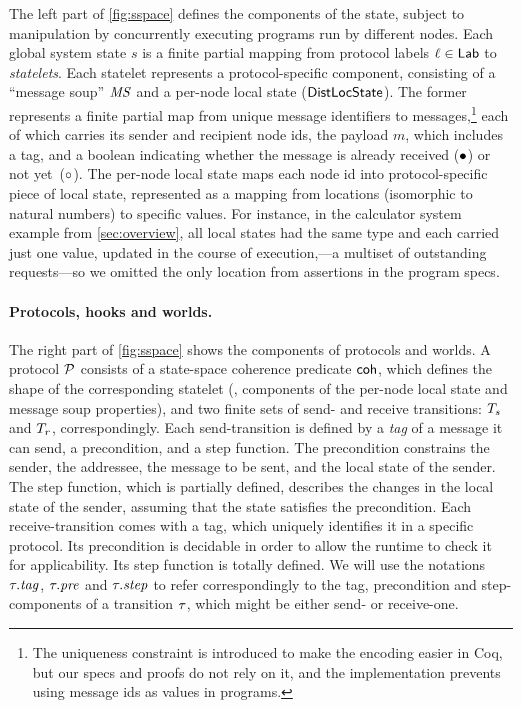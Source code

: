 The left part of \cref{fig:sspace} defines the components of the
state, subject to manipulation by concurrently executing programs run
by different nodes. Each global system state $s$ is a finite partial
mapping from protocol labels $\ell \in \mathsf{Lab}$ to \emph{statelets}. Each
statelet represents a protocol-specific component, consisting of a
``message soup'' $\mathit{MS}$ and a per-node local state ($\mathsf{DistLocState}$). The
former represents a finite partial map from unique message identifiers
to messages,\footnote{The uniqueness constraint is introduced to make
  the encoding easier in Coq, but our specs and proofs do not rely on
  it, and the implementation prevents using message ids as values in
  programs.} each of which carries its sender and recipient node ids,
the payload $m$, which includes a tag, and a boolean indicating
whether the message is already received ($\bullet$) or not
yet~($\circ$).
%
The per-node local state maps each node id into protocol-specific
piece of local state, represented as a mapping from locations
(isomorphic to natural numbers) to specific values. For instance, in
the calculator system example from \cref{sec:overview}, all
local states had the same type and each carried just one value,
updated in the course of execution,---a multiset of outstanding
requests---so we omitted the only location from assertions in the
program specs.


\paragraph{Protocols, hooks and worlds.}
\label{sec:protocols-worlds}

The right part of \cref{fig:sspace} shows the components of \disel
protocols and worlds. A protocol $\mathcal{P}$ consists of a state-space
coherence predicate $\mathsf{coh}$, which defines the shape of the
corresponding statelet (\ie, components of the per-node local state
and message soup properties), and two finite sets of send- and receive
transitions: $T_s$ and $T_r$, correspondingly.
%
Each send-transition is defined by a \emph{tag} of a message it can
send, a precondition, and a step function. The precondition constrains
the sender, the addressee, the message to be sent, and the local state
of the sender.
%
The step function, which is partially defined, describes the changes
in the local state of the sender, assuming that the state satisfies
the precondition.
%
Each receive-transition comes with a tag, which uniquely identifies it
in a specific protocol. Its precondition is decidable in order to
allow the runtime to check it for applicability. Its
step function is totally defined.
%
We will use the notations $\tau.\mathit{tag}$, $\tau.\mathit{pre}$ and
$\tau.\mathit{step}$ to refer correspondingly to the tag, precondition and
step-components of a transition $\tau$, which might be either send-
or receive-one.


